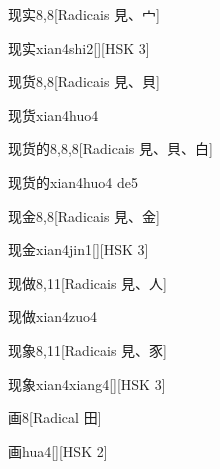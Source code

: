 \begin{entry}{现实}{8,8}[Radicais ⾒、⼧]
  \begin{phonetics}{现实}{xian4shi2}[][HSK 3]
  \end{phonetics}
\end{entry}

\begin{entry}{现货}{8,8}[Radicais ⾒、⾙]
  \begin{phonetics}{现货}{xian4huo4}
  \end{phonetics}
\end{entry}

\begin{entry}{现货的}{8,8,8}[Radicais ⾒、⾙、⽩]
  \begin{phonetics}{现货的}{xian4huo4 de5}
  \end{phonetics}
\end{entry}

\begin{entry}{现金}{8,8}[Radicais ⾒、⾦]
  \begin{phonetics}{现金}{xian4jin1}[][HSK 3]
  \end{phonetics}
\end{entry}

\begin{entry}{现做}{8,11}[Radicais ⾒、⼈]
  \begin{phonetics}{现做}{xian4zuo4}
  \end{phonetics}
\end{entry}

\begin{entry}{现象}{8,11}[Radicais ⾒、⾗]
  \begin{phonetics}{现象}{xian4xiang4}[][HSK 3]
  \end{phonetics}
\end{entry}

\begin{entry}{画}{8}[Radical ⽥]
  \begin{phonetics}{画}{hua4}[][HSK 2]
  \end{phonetics}
\end{entry}

